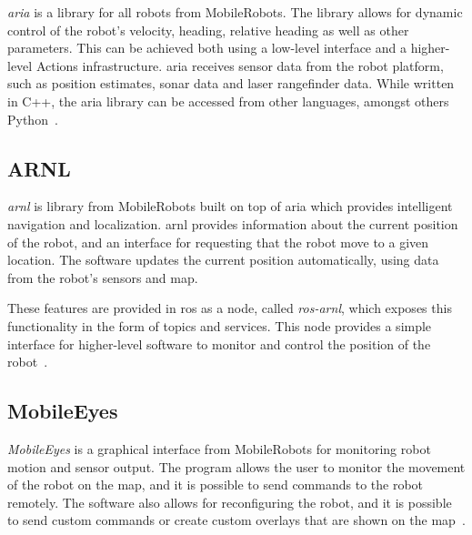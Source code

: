 \documentclass[\rootfolder/main.tex]{subfiles}
\begin{document}
\emph{\acrfull{aria}} is a \CC library for all robots from MobileRobots.
The library allows for dynamic control of the robot's velocity, heading, relative heading as well as other parameters.
This can be achieved both using a low-level interface and a higher-level Actions infrastructure.
\acrshort{aria} receives sensor data from the robot platform, such as position estimates, sonar data and laser rangefinder data.
While written in C++, the \acrshort{aria} library can be accessed from other languages, amongst others Python~\cite{ARIA}.

\subsection{ARNL}

\emph{\acrfull{arnl}} is \CC library from MobileRobots built on top of \acrshort{aria} which provides intelligent navigation and localization.
\acrshort{arnl} provides information about the current position of the robot, and an interface for requesting that the robot move to a given location.
The software updates the current position automatically, using data from the robot's sensors and map.

These features are provided in \acrshort{ros} as a node, called \emph{ros-arnl}, which exposes this functionality in the form of topics and services.
This node provides a simple interface for higher-level software to monitor and control the position of the robot~\cite{ARNL}.


\subsection{MobileEyes}

\emph{MobileEyes} is a graphical interface from MobileRobots for monitoring robot motion and sensor output.
The program allows the user to monitor the movement of the robot on the map, and it is possible to send commands to the robot remotely.
The software also allows for reconfiguring the robot, and it is possible to send custom commands or create custom overlays that are shown on the map~\cite{MobileEyes}.

\end{document}
